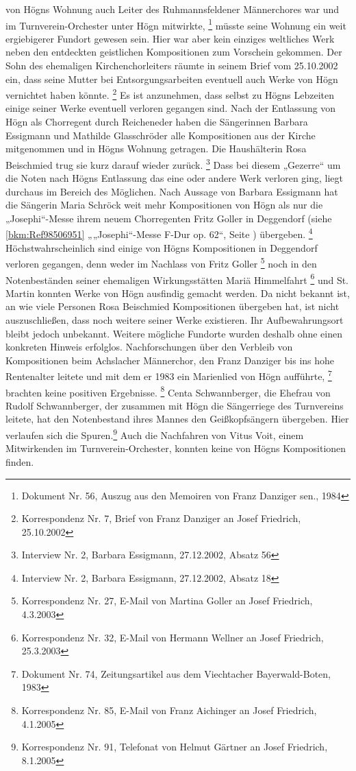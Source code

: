 \documentclass[a4paper]{article}
\begin{document}
von Högns Wohnung auch Leiter des Ruhmannsfeldener Männerchores war und
im Turnverein-Orchester unter Högn mitwirkte, \footnote{Dokument Nr.
56, Auszug aus den Memoiren von Franz Danziger sen., 1984} müsste seine
Wohnung ein weit ergiebigerer Fundort gewesen sein. Hier war aber kein
einziges weltliches Werk neben den entdeckten geistlichen Kompositionen
zum Vorschein gekommen. Der Sohn des ehemaligen Kirchenchorleiters
räumte in seinem Brief vom 25.10.2002 ein, dass seine Mutter bei
Entsorgungsarbeiten eventuell auch Werke von Högn vernichtet haben
könnte. \footnote{Korrespondenz Nr. 7, Brief von Franz Danziger an
Josef Friedrich, 25.10.2002} Es ist anzunehmen, dass selbst zu Högns
Lebzeiten einige seiner Werke eventuell verloren gegangen sind. Nach
der Entlassung von Högn als Chorregent durch Reicheneder haben die
Sängerinnen Barbara Essigmann und Mathilde Glasschröder alle
Kompositionen aus der Kirche mitgenommen und in Högns Wohnung getragen.
Die Haushälterin Rosa Beischmied trug sie kurz darauf wieder
zurück. \footnote{Interview Nr. 2, Barbara Essigmann, 27.12.2002,
Absatz 56} Dass bei diesem „Gezerre“ um die Noten nach Högns Entlassung
das eine oder andere Werk verloren ging, liegt durchaus im Bereich des
Möglichen. Nach Aussage von Barbara Essigmann hat die Sängerin Maria
Schröck weit mehr Kompositionen von Högn als nur die „Josephi“-Messe
ihrem neuem Chorregenten Fritz Goller in Deggendorf (siehe
\ref{bkm:Ref98506951} „„Josephi“-Messe F-Dur op. 62“, Seite
\pageref{bkm:Ref98506963}) übergeben. \footnote{Interview Nr. 2,
Barbara Essigmann, 27.12.2002, Absatz 18} Höchstwahrscheinlich sind
einige von Högns Kompositionen in Deggendorf verloren gegangen, denn
weder im Nachlass von Fritz Goller \footnote{Korrespondenz Nr. 27,
E-Mail von Martina Goller an Josef Friedrich, 4.3.2003} noch in den
Notenbeständen seiner ehemaligen Wirkungsstätten Mariä
Himmelfahrt \footnote{Korrespondenz Nr. 32, E-Mail von Hermann Wellner
an Josef Friedrich, 25.3.2003} und St. Martin konnten Werke von Högn
ausfindig gemacht werden. Da nicht bekannt ist, an wie viele Personen
Rosa Beischmied Kompositionen übergeben hat, ist nicht auszuschließen,
dass noch weitere seiner Werke existieren. Ihr Aufbewahrungsort bleibt
jedoch unbekannt. Weitere mögliche Fundorte wurden deshalb ohne einen
konkreten Hinweis erfolglos. Nachforschungen über den Verbleib von
Kompositionen beim Achslacher Männerchor, den Franz Danziger bis ins
hohe Rentenalter leitete und mit dem er 1983 ein Marienlied von Högn
aufführte, \footnote{Dokument Nr. 74, Zeitungsartikel aus dem
Viechtacher Bayerwald-Boten, 1983} brachten keine positiven
Ergebnisse. \footnote{Korrespondenz Nr. 85, E-Mail von Franz Aichinger
an Josef Friedrich, 4.1.2005} Centa Schwannberger, die Ehefrau von
Rudolf Schwannberger, der zusammen mit Högn die Sängerriege des
Turnvereins leitete, hat den Notenbestand ihres Mannes den
Geißkopfsängern übergeben. Hier verlaufen sich die Spuren.\footnote{
Korrespondenz Nr. 91, Telefonat von Helmut Gärtner an Josef Friedrich,
8.1.2005} Auch die Nachfahren von Vitus Voit, einem Mitwirkenden im
Turnverein-Orchester, konnten keine von Högns Kompositionen finden.
\end{document}
